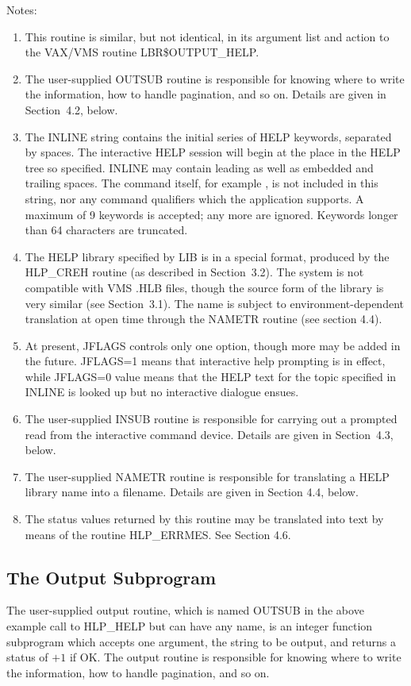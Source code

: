 Notes:
\nopagebreak
\begin{enumerate}
\item This routine is similar, but not identical, in its argument list
and action to the VAX/VMS routine LBR\$OUTPUT\_HELP.
\item The user-supplied OUTSUB routine is responsible for
knowing where to
write the information, how to handle pagination, and so on.  Details
are given in Section~4.2, below.
\item The INLINE string contains the initial series of HELP keywords,
separated by spaces.  The interactive HELP session will begin at the
place in the HELP tree so specified.  INLINE may contain leading as well as
embedded and trailing spaces.  The command itself, for example
, is not included in this string, nor any command
qualifiers which the application supports.  A maximum of 9 keywords is
accepted;  any more are ignored.  Keywords longer than 64 characters
are truncated.
\item The HELP library specified by LIB is in a special format, produced by
the HLP\_CREH routine
(as described in Section~3.2).  The system is not compatible with
VMS .HLB files, though the source form of the library is very
similar (see Section~3.1).  The name is subject to environment-dependent
translation at open time through the NAMETR routine (see
section 4.4).
\item At present, JFLAGS controls only one option, though more
may be added in the future.  JFLAGS=1 means that
interactive help prompting is in effect, while JFLAGS=0
value means that the HELP text for the topic specified in
INLINE is looked up but no interactive dialogue ensues.
\item The user-supplied INSUB routine is responsible for
carrying out a prompted read from the interactive command device.
Details are given in Section~4.3, below.
\item The user-supplied NAMETR routine is responsible for translating
a HELP library name into a filename.  Details are given in Section 4.4,
below.
\item The status values returned by this routine may be translated into
text by means of the routine HLP\_ERRMES.  See Section 4.6.
\end{enumerate}

\subsection{The Output Subprogram}
The user-supplied output routine, which is named OUTSUB in the above
example call to HLP\_HELP but can have any name,
is an integer function subprogram which
accepts one argument, the string to be output, and returns a
status of $+1$ if OK.  The output routine is responsible for knowing where to
write the information, how to handle pagination, and so on.

